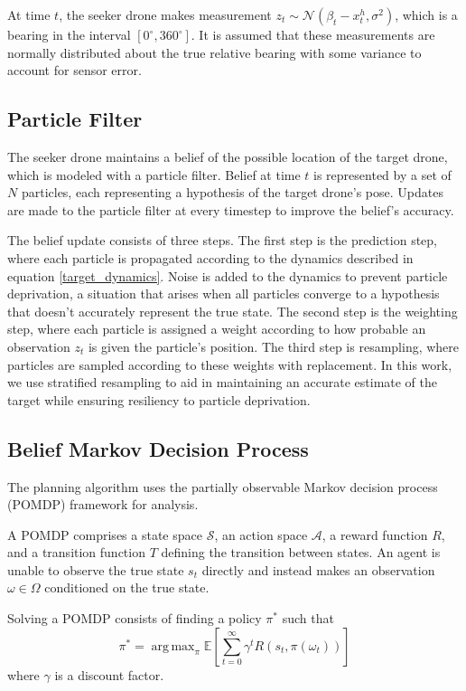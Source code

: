 \documentclass[10pt,twocolumn,letterpaper]{article}
\DeclareMathOperator*{\argmax}{arg\,max}
\begin{document}
At time $t$, the seeker drone makes measurement $z_t \sim \mathcal{N}(\beta_t - x_t^h, \sigma^2)$, which is a bearing in the interval $[0^{\circ}, 360^{\circ}]$.
It is assumed that these measurements are normally distributed about the true relative bearing with some variance to account for sensor error.

\subsection{Particle Filter}
The seeker drone maintains a belief of the possible location of the target drone, which is modeled with a particle filter.
Belief at time $t$ is represented by a set of $N$ particles, each representing a hypothesis of the target drone's pose.
Updates are made to the particle filter at every timestep to improve the belief's accuracy.

The belief update consists of three steps. 
The first step is the prediction step, where each particle is propagated according to the dynamics described in equation \ref{target_dynamics}.
Noise is added to the dynamics to prevent particle deprivation, a situation that arises when all particles converge to a hypothesis that doesn't accurately represent the true state.
The second step is the weighting step, where each particle is assigned a weight according to how probable an observation $z_t$ is given the particle's position.
The third step is resampling, where particles are sampled according to these weights with replacement.
In this work, we use stratified resampling to aid in maintaining an accurate estimate of the target while ensuring resiliency to particle deprivation.

\subsection{Belief Markov Decision Process}

The planning algorithm uses the partially observable Markov decision process (POMDP) framework for analysis.

A POMDP comprises a state space $\mathcal{S}$, an action space $\mathcal{A}$, a reward function $R$, and a transition function $T$ defining the transition between states.
An agent is unable to observe the true state $s_t$ directly and instead makes an observation $\omega \in \Omega$ conditioned on the true state.

Solving a POMDP consists of finding a policy $\pi^*$ such that
\begin{equation}
\pi^* = \argmax_{\pi}{\mathbb{E}\left [ \sum_{t=0}^{\infty}\gamma^{t}R(s_t, \pi(\omega_t)) \right ]}
\label{optimal_policy}
\end{equation}
where $\gamma$ is a discount factor.
\end{document}
